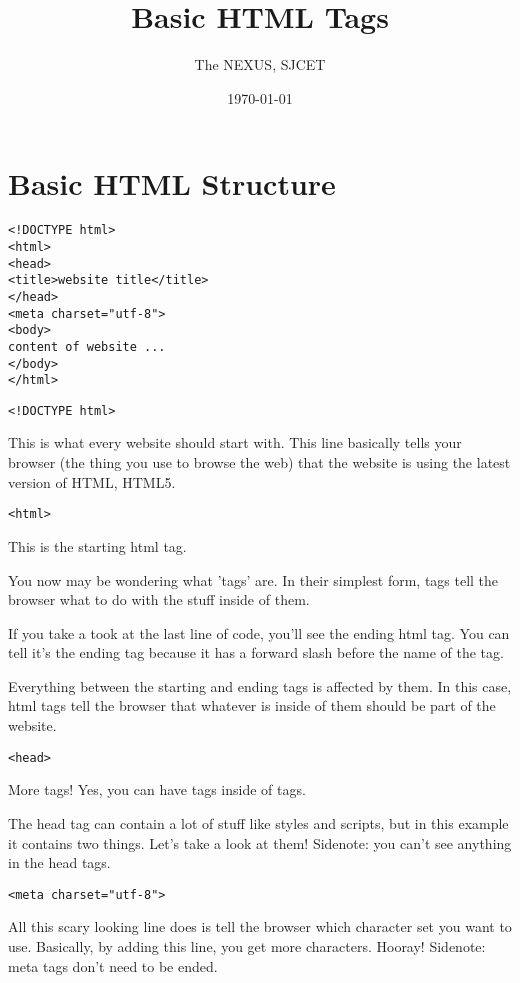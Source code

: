 \documentclass[11pt]{article}
\author{The NEXUS, SJCET}
\date{\today}
\title{Basic HTML Tags}
\begin{document}
\maketitle
\section*{Basic HTML Structure}
\label{sec:org85f209f}
\begin{verbatim}
<!DOCTYPE html>
<html>
<head>
<title>website title</title>
</head>
<meta charset="utf-8">
<body>
content of website ...
</body>
</html>
\end{verbatim}

\begin{verbatim}
<!DOCTYPE html>
\end{verbatim}

This is what every website should start with. This line basically tells your browser (the thing you use to browse the web) that the website is using the latest version of HTML, HTML5.

\begin{verbatim}
<html>
\end{verbatim}

This is the starting html tag.

You now may be wondering what 'tags' are. In their simplest form, tags tell the browser what to do with the stuff inside of them.

If you take a took at the last line of code, you'll see the ending html tag. You can tell it's the ending tag because it has a forward slash before the name of the tag.

Everything between the starting and ending tags is affected by them. In this case, html tags tell the browser that whatever is inside of them should be part of the website.

\begin{verbatim}
<head>
\end{verbatim}

More tags! Yes, you can have tags inside of tags.

The head tag can contain a lot of stuff like styles and scripts, but in this example it contains two things. Let's take a look at them! Sidenote: you can't see anything in the head tags.

\begin{verbatim}
<meta charset="utf-8">
\end{verbatim}

All this scary looking line does is tell the browser which character set you want to use. Basically, by adding this line, you get more characters. Hooray! Sidenote: meta tags don't need to be ended.
\end{document}
